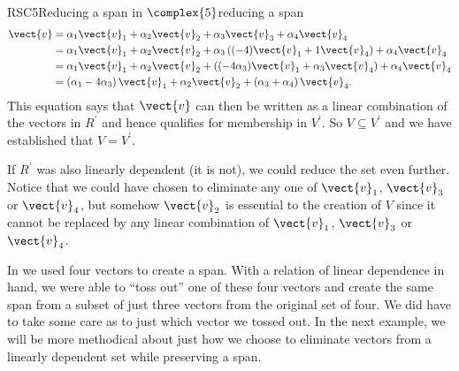 \begin{example}{RSC5}{Reducing a span in $\complex{5}$}{reducing a span}
%
\begin{align*}
\vect{v}&=
%
\alpha_1\vect{v}_1+\alpha_2\vect{v}_2+\alpha_3\vect{v}_3+\alpha_4\vect{v}_4\\
%
&=\alpha_1\vect{v}_1+\alpha_2\vect{v}_2+
\alpha_3\left((-4)\vect{v}_1+1\vect{v}_4\right)+
\alpha_4\vect{v}_4\\
%
&=\alpha_1\vect{v}_1+\alpha_2\vect{v}_2+
\left((-4\alpha_3)\vect{v}_1+\alpha_3\vect{v}_4\right)+
\alpha_4\vect{v}_4\\
%
&=\left(\alpha_1-4\alpha_3\right)\vect{v}_1+
\alpha_2\vect{v}_2+
\left(\alpha_3+\alpha_4\right)\vect{v}_4.
\end{align*}
%
This equation says that $\vect{v}$ can then be written as a linear combination of the vectors in $R^\prime$ and hence qualifies for membership in $V^\prime$.  So $V\subseteq V^\prime$ and we have established that $V=V^\prime$.\par
%
If $R^\prime$ was also linearly dependent (it is not), we could reduce the set even further.  Notice that we could have chosen to eliminate any one of $\vect{v}_1$, $\vect{v}_3$ or $\vect{v}_4$, but somehow $\vect{v}_2$ is essential to the creation of $V$ since it cannot be replaced by any linear combination of $\vect{v}_1$, $\vect{v}_3$ or $\vect{v}_4$.
%
\end{example}
%
%
In  we used four vectors to create a span.  With a relation of linear dependence in hand, we were able to ``toss out'' one of these four vectors and create the same span from a subset of just three vectors from the original set of four.  We did have to take some care as to just which vector we tossed out.  In the next example, we will be more methodical about just how we choose to eliminate vectors from a linearly dependent set while preserving a span.
